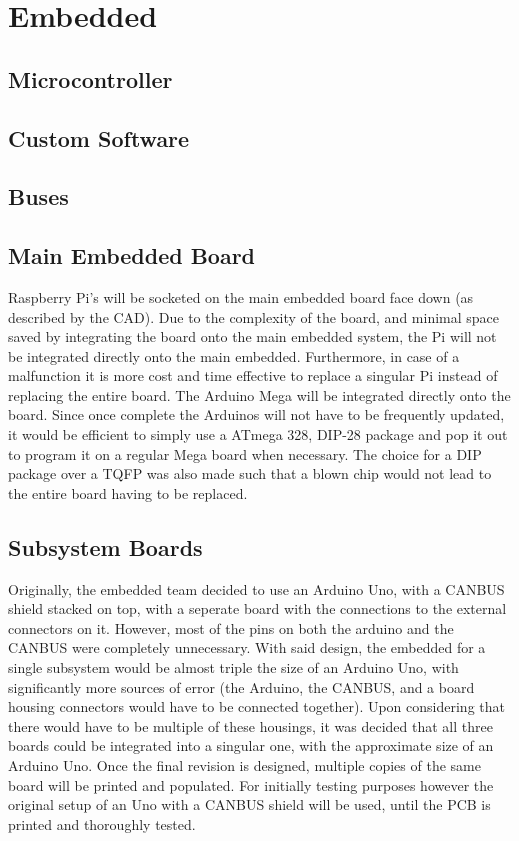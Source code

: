 \documentclass[main.tex]{subfile}
\begin{document}
    \section{Embedded}
    \subsection{Microcontroller}
    \subsection{Custom Software}
    \subsection{Buses}
    \subsection{Main Embedded Board}
    Raspberry Pi’s will be socketed on the main embedded board face down (as described by the CAD). Due to the complexity of the board, and minimal space saved by integrating the board onto the main embedded system, the Pi will not be integrated directly onto the main embedded. Furthermore, in case of a malfunction it is more cost and time effective to replace a singular Pi instead of replacing the entire board. The Arduino Mega will be integrated directly onto the board. Since once complete the Arduinos will not have to be frequently updated, it would be efficient to simply use a ATmega 328, DIP-28 package and pop it out to program it on a regular Mega board when necessary. The choice for a DIP package over a TQFP was also made such that a blown chip would not lead to the entire board having to be replaced.

    \subsection{Subsystem Boards}
    Originally, the embedded team decided to use an Arduino Uno, with a CANBUS shield stacked on top, with a seperate board with the connections to the external connectors on it. However, most of the pins on both the arduino and the CANBUS were completely unnecessary. With said design, the embedded for a single subsystem would be almost triple the size of an Arduino Uno, with significantly more sources of error (the Arduino, the CANBUS, and a board housing connectors would have to be connected together).  Upon considering that there would have to be multiple of these housings, it was decided that all three boards could be integrated into a singular one, with the approximate size of an Arduino Uno. Once the final revision is designed, multiple copies of the same board will be printed and populated. For initially testing purposes however the original setup of an Uno with a CANBUS shield will be used, until the PCB is printed and thoroughly tested.
\end{document}
